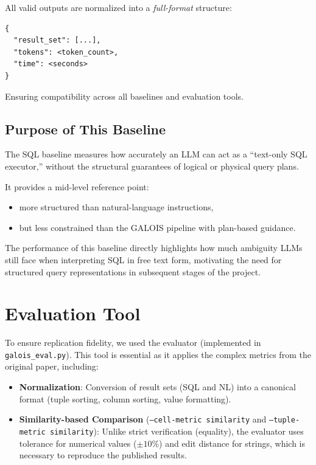 \documentclass[12pt]{article}
\begin{document}
All valid outputs are normalized into a \emph{full-format} structure:

\begin{verbatim}
{
  "result_set": [...],
  "tokens": <token_count>,
  "time": <seconds>
}
\end{verbatim}

Ensuring compatibility across all baselines and evaluation tools.

\subsection{Purpose of This Baseline}

The SQL baseline measures how accurately an LLM can act as a ``text-only SQL executor,'' without the structural guarantees of logical or physical query plans.

It provides a mid-level reference point:
\begin{itemize}
    \item more structured than natural-language instructions,
    \item but less constrained than the GALOIS pipeline with plan-based guidance.
\end{itemize}

The performance of this baseline directly highlights how much ambiguity LLMs still face when interpreting SQL in free text form, motivating the need for structured query representations in subsequent stages of the project.



\section{Evaluation Tool}

To ensure replication fidelity, we used the evaluator (implemented in \texttt{galois\_eval.py}). This tool is essential as it applies the complex metrics from the original paper, including:

\begin{itemize}
    \item \textbf{Normalization}: Conversion of result sets (SQL and NL) into a canonical format (tuple sorting, column sorting, value formatting).
    \item \textbf{Similarity-based Comparison} (\texttt{--cell-metric similarity} and \texttt{--tuple-metric similarity}): Unlike strict verification (equality), the evaluator uses tolerance for numerical values ($\pm 10\%$) and edit distance for strings, which is necessary to reproduce the published results.
\end{itemize}
\end{document}
